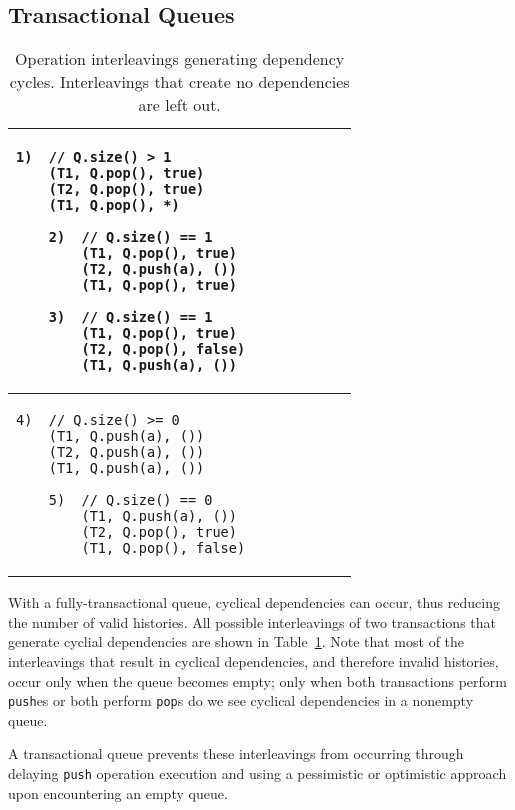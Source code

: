 \subsection{Transactional Queues}

\begin{table}
    \centering
    \begin{tabular}{|l|}
        \hline
\begin{lstlisting}
1)  // Q.size() > 1 
    (T1, Q.pop(), true)        
    (T2, Q.pop(), true)        
    (T1, Q.pop(), *)
\end{lstlisting}
\begin{lstlisting}
    2)  // Q.size() == 1  
        (T1, Q.pop(), true)     
        (T2, Q.push(a), ())             
        (T1, Q.pop(), true)
    \end{lstlisting}
    \begin{lstlisting}
    3)  // Q.size() == 1  
        (T1, Q.pop(), true)     
        (T2, Q.pop(), false)     
        (T1, Q.push(a), ())             
\end{lstlisting}
    \\
    \hline
\begin{lstlisting}
4)  // Q.size() >= 0 
    (T1, Q.push(a), ())
    (T2, Q.push(a), ())             
    (T1, Q.push(a), ())             
\end{lstlisting}
    \begin{lstlisting}
    5)  // Q.size() == 0 
        (T1, Q.push(a), ())             
        (T2, Q.pop(), true)
        (T1, Q.pop(), false)
\end{lstlisting}
\\
        \hline
\end{tabular}
    \caption{Operation interleavings generating dependency cycles. Interleavings that create no dependencies are left out.}
    \label{tab:interleavings}
\end{table}

With a fully-transactional queue, cyclical dependencies can occur, thus reducing the number of valid histories. All possible interleavings of two transactions that generate cyclial dependencies are shown in Table~\ref{tab:interleavings}. Note that most of the interleavings that result in cyclical dependencies, and therefore invalid histories, occur only when the queue becomes empty; only when both transactions perform \texttt{push}es or both perform \texttt{pop}s do we see cyclical dependencies in a nonempty queue. 

A transactional queue prevents these interleavings from occurring through delaying \texttt{push} operation execution and using a pessimistic or optimistic approach upon encountering an empty queue.

